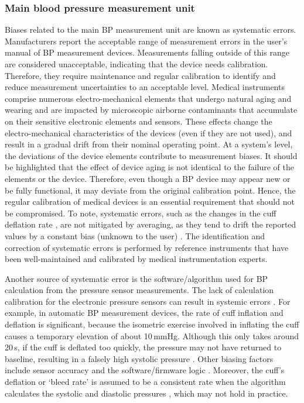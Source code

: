 \documentclass[journal,article,moreauthors]{Definitions/mdpi}
\begin{document}
\subsubsection{Main blood pressure measurement unit} 
Biases related to the main BP measurement unit are known as systematic errors. Manufacturers report the acceptable range of measurement errors in the user's manual of BP measurement devices. Measurements falling outside of this range are considered unacceptable, indicating that the device needs calibration. Therefore, they require maintenance and regular calibration to identify and reduce measurement uncertainties to an acceptable level. Medical instruments comprise numerous electro-mechanical elements that undergo natural aging and wearing and are impacted by microscopic airborne contaminants that accumulate on their sensitive electronic elements and sensors. These effects change the electro-mechanical characteristics of the devices (even if they are not used), and result in a gradual drift from their nominal operating point. At a system's level, the deviations of the device elements contribute to measurement biases. It should be highlighted that the effect of device aging is not identical to the failure of the elements or the device. Therefore, even though a BP device may appear new or be fully functional, it may deviate from the original calibration point. Hence, the regular calibration of medical devices is an essential requirement that should not be compromised. %
To note, systematic errors, such as the changes in the cuff deflation rate \citep{Yong1987-gn}, are not mitigated by averaging, as they tend to drift the reported values by a constant bias (unknown to the user) \citep{speechly2007sphygmomanometer}. The identification and correction of systematic errors is performed by reference instruments that have been well-maintained and calibrated by medical instrumentation experts.

Another source of systematic error is the software/algorithm used for BP calculation from the pressure sensor measurements. The lack of calculation calibration for the electronic pressure sensors can result in systemic errors \citep{speechly2007sphygmomanometer, turner2004effects}. For example, in automatic BP measurement devices, the rate of cuff inflation and deflation is significant, because the isometric exercise involved in inflating the cuff causes a temporary elevation of about 10\,mmHg. Although this only takes around 20\,s, if the cuff is deflated too quickly, the pressure may not have returned to baseline, resulting in a falsely high systolic pressure \citep{ogedegbe2010principles}. Other biasing factors include sensor accuracy and the software/firmware logic \citep{Kumar2021-em}. Moreover, the cuff's deflation or `bleed rate' is assumed to be a consistent rate when the algorithm calculates the systolic and diastolic pressures \citep{Kumar2021-em}, which may not hold in practice.
\end{document}
